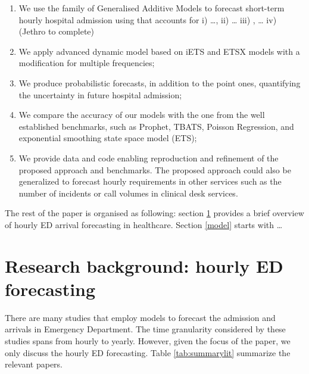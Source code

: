 \documentclass[]{elsarticle} %
\begin{document}
\begin{enumerate}
\def\labelenumi{\arabic{enumi}.}
\item
  We use the family of Generalised Additive Models to forecast short-term hourly hospital admission using that accounts for i) \ldots, ii) \ldots{} iii) , \ldots{} iv) (Jethro to complete)
\item
  We apply advanced dynamic model based on iETS \citep{Svetunkov2019a} and ETSX models with a modification for multiple frequencies;
\item
  We produce probabilistic forecasts, in addition to the point ones, quantifying the uncertainty in future hospital admission;
\item
  We compare the accuracy of our models with the one from the well established benchmarks, such as Prophet, TBATS, Poisson Regression, and exponential smoothing state space model (ETS);
\item
  We provide data and code enabling reproduction and refinement of the proposed approach and benchmarks. The proposed approach could also be generalized to forecast hourly requirements in other services such as the number of incidents or call volumes in clinical desk services.
\end{enumerate}

The rest of the paper is organised as following: section \ref{lit} provides a brief overview of hourly ED arrival forecasting in healthcare. Section \ref{model} starts with \ldots{}

\hypertarget{lit}{%
\section{Research background: hourly ED forecasting}\label{lit}}

There are many studies that employ models to forecast the admission and arrivals in Emergency Department. The time granularity considered by these studies spans from hourly to yearly. However, given the focus of the paper, we only discuss the hourly ED forecasting. Table \ref{tab:summarylit} summarize the relevant papers.
\end{document}
